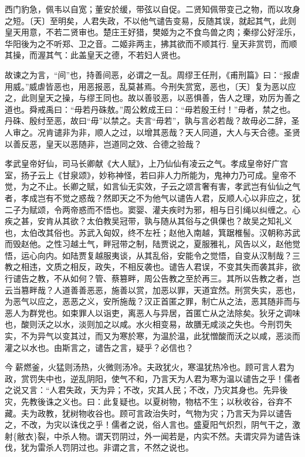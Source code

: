 \documentclass[]{article}
\begin{document}
西门豹急，佩韦以自宽；董安於缓，带弦以自促。二贤知佩带变己之物，而以攻身之短。〔天〕至明矣，人君失政，不以他气谴告变易，反随其误，就起其气，此则皇天用意，不若二贤审也。楚庄王好猎，樊姬为之不食鸟兽之肉；秦缪公好淫乐，华阳後为之不听郑、卫之音。二姬非两主，拂其欲而不顺其行.
皇天非赏罚，而顺其操，而渥其气：此盖皇天之德，不若妇人贤也。

故谏之为言，``间''也，持善间恶，必谓之一乱。周缪王任刑，《甫刑篇》曰：``报虐用威。''威虐皆恶也，用恶报恶，乱莫甚焉。今刑失赏宽，恶也，〔天〕复为恶以应之，此则皇天之操，与缪王同也。故以善驳恶，以恶惧善，告人之理，劝厉为善之道也。舜戒禹曰：``毋若丹硃敖。''周公敕成王曰：``毋若殷王纣！''毋者，禁之也。丹硃、殷纣至恶，故曰``毋''以禁之。夫言``毋若''，孰与言必若哉？故毋必二辞，圣人审之。况肯谴非为非，顺人之过，以增其恶哉？天人同道，大人与天合德。圣贤以善反恶，皇天以恶随非，岂道同之效、合德之验哉？

孝武皇帝好仙，司马长卿献《大人赋》，上乃仙仙有凌云之气。孝成皇帝好广宫室，扬子云上《甘泉颂》，妙称神怪，若曰非人力所能为，鬼神力乃可成。皇帝不觉，为之不止。长卿之赋，如言仙无实效，子云之颂言奢有害，孝武岂有仙仙之气者，孝成岂有不觉之惑哉？然即天之不为他气以谴告人君，反顺人心以非应之，犹二子为赋颂，令两帝惑而不悟也。窦婴、灌夫疾时为邪，相与日引绳以纠缠之。心疾之甚，安肯从其欲？太伯教吴冠带，孰与随从其俗与之俱倮也？故吴之知礼义也，太伯改其俗也。苏武入匈奴，终不左衽；赵他入南越，箕踞椎髻。汉朝称苏武而毁赵他。之性习越土气，畔冠带之制，陆贾说之，夏服雅礼，风告以义，赵他觉悟，运心向内。如陆贾复越服夷谈，从其乱俗，安能令之觉悟，自变从汉制哉？三教之相违，文质之相反，政失，不相反袭也。谴告人君误，不变其失而袭其非，欲行谴告之教，不从如何？管、蔡篡畔，周公告教之至於再三。其所以告教之者，岂云当篡畔哉？人道善善恶恶，施善以赏，加恶以罪，天道宜然。刑赏失实，恶也，为恶气以应之，恶恶之义，安所施哉？汉正首匿之罪，制亡从之法，恶其随非而与恶人为群党也。如束罪人以诣吏，离恶人与异居，首匿亡从之法除矣。狄牙之调味也，酸则沃之以水，淡则加之以咸。水火相变易，故膳无咸淡之失也。今刑罚失实，不为异气以变其过，而又为寒於寒，为温於温，此犹憎酸而沃之以咸，恶淡而灌之以水也。由斯言之，谴告之言，疑乎？必信也？

今薪燃釜，火猛则汤热，火微则汤冷。夫政犹火，寒温犹热冷也。顾可言人君为政，赏罚失中也，逆乱阴阳，使气不和，乃言天为人君为寒为温以谴告之乎！儒者之说又言：``人君失政，天为异；不改，灾其人民；不改，乃灾其身也。先异後灾，先教後诛之义也。曰：此复疑也。以夏树物，物枯不生；以秋收谷，谷弃不藏。夫为政教，犹树物收谷也。顾可言政治失时，气物为灾；乃言天为异以谴告之，不改，为灾以诛伐之乎！儒者之说，俗人言也。盛夏阳气炽烈，阴气干之，激射\{敝衣\}裂，中杀人物。谓天罚阴过，外一闻若是，内实不然。夫谓灾异为谴告诛伐，犹为雷杀人罚阴过也。非谓之言，不然之说也。
\end{document}
